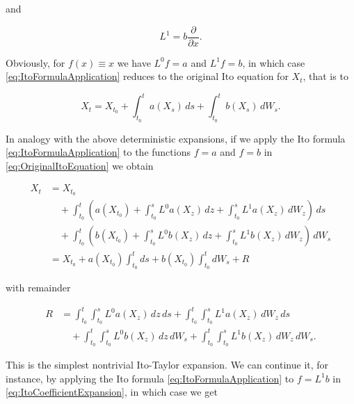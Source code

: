 \noindent and

\begin{equation} \label{eq:OperatorL1}
    L^1 = b \frac{\partial}{\partial x}.
\end{equation}

\noindent Obviously, for $f(x) \equiv x$ we have $L^0 f = a$ and $L^1 f = b$, in which case \eqref{eq:ItoFormulaApplication} reduces to the original Ito equation for $X_t$, that is to

\begin{equation} \label{eq:OriginalItoEquation}
    X_t = X_{t_0} + \int_{t_0}^t a(X_s) \, ds + \int_{t_0}^t b(X_s) \, dW_s.
\end{equation}

\noindent In analogy with the above deterministic expansions, if we apply the Ito formula \eqref{eq:ItoFormulaApplication} to the functions $f = a$ and $f = b$ in \eqref{eq:OriginalItoEquation} we obtain

\begin{equation} \label{eq:ItoCoefficientExpansion}
\begin{split}
    X_t &= X_{t_0} \\
    &\quad + \int_{t_0}^t \left( a(X_{t_0}) + \int_{t_0}^s L^0 a(X_z) \, dz + \int_{t_0}^s L^1 a(X_z) \, dW_z \right) \, ds \\
    &\quad + \int_{t_0}^t \left( b(X_{t_0}) + \int_{t_0}^s L^0 b(X_z) \, dz + \int_{t_0}^s L^1 b(X_z) \, dW_z \right) \, dW_s \\
    &= X_{t_0} + a(X_{t_0}) \int_{t_0}^t ds + b(X_{t_0}) \int_{t_0}^t dW_s + R
\end{split}
\end{equation}

\noindent with remainder

\begin{equation} \label{eq:FirstRemainder}
\begin{split}
    R &= \int_{t_0}^t \int_{t_0}^s L^0 a(X_z) \, dz \, ds + \int_{t_0}^t \int_{t_0}^s L^1 a(X_z) \, dW_z \, ds \\
    &\quad + \int_{t_0}^t \int_{t_0}^s L^0 b(X_z) \, dz \, dW_s + \int_{t_0}^t \int_{t_0}^s L^1 b(X_z) \, dW_z \, dW_s.
\end{split}
\end{equation}

\noindent This is the simplest nontrivial Ito-Taylor expansion. We can continue it, for instance, by applying the Ito formula \eqref{eq:ItoFormulaApplication} to $f = L^1 b$ in \eqref{eq:ItoCoefficientExpansion}, in which case we get

